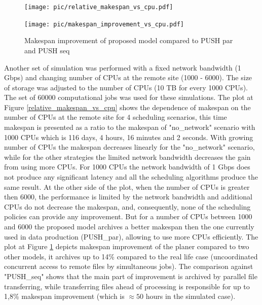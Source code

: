 \documentclass{svjour3}                     %
\begin{document}

\begin{figure}[h]
\centering
\begin{minipage}{.7\textwidth}
\centering
    \texttt{[image: pic/relative\_makespan\_vs\_cpu.pdf]}

    \caption{Dependence of makespan on number of CPUs at the remote node connected over 1 Gbps link.}
    \label{relative_makespan_vs_cpu}
\end{minipage}\hspace{1pc}%
\begin{minipage}{.7\textwidth}
\centering
    \texttt{[image: pic/makespan\_improvement\_vs\_cpu.pdf]}
    \caption{Makespan improvement of proposed model compared to PUSH par and PUSH seq}
    \label{makespan_improvement_vs_cpu}
\end{minipage} 
\end{figure}
Another set of simulation was performed with a fixed network bandwidth (1 Gbps) and changing number of CPUs at the remote site (1000 - 6000). The size of storage was adjusted to the number of CPUs (10 TB for every 1000 CPUs). The set of 60000 computational jobs was used for these simulations. The plot at Figure \ref{relative_makespan_vs_cpu} shows the dependence of makespan on the number of CPUs at the remote site for 4 scheduling scenarios, this time makespan is presented as a ratio to the makespan of "no\_network" scenario with 1000 CPUs which is 116 days, 4 hours, 16 minutes and 2 seconds. With growing number of CPUs the makespan decreases linearly for the "no\_network" scenario, while for the other strategies the limited network bandwidth decreases the gain from using more CPUs. For 1000 CPUs the network bandwidth of 1 Gbps does not produce any significant latency and all the scheduling algorithms produce the same result. At the other side of the plot, when the number of CPUs is greater then 6000, the performance is limited by the network bandwidth and additional CPUs do not decrease the makespan, and, consequently, none of the scheduling policies can provide any improvement. But for a number of CPUs between 1000 and 6000 the proposed model archives a better makespan then the one currently used in data production (PUSH\_par), allowing to use more CPUs efficiently. The plot at Figure \ref{makespan_improvement_vs_cpu} depicts makespan improvement of the planer compared to two other models, it archives up to 14\% compared to the real life case (uncoordinated concurrent access to remote files by simultaneous jobs). The comparison against "PUSH\_seq" shows that the main part of improvement is archived by parallel file transferring, while transferring files ahead of processing is responsible for up to 1,8\% makespan improvement (which is $\approx50$ hours in the simulated case).
\end{document}
